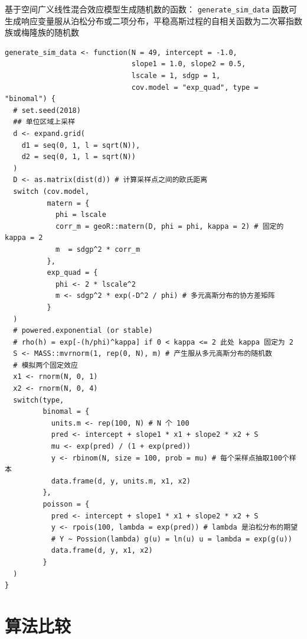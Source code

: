 \documentclass[12pt,a4paper,UTF8,twoside]{book}
\theoremstyle{definition}
\theoremstyle{definition}
\theoremstyle{definition}
\theoremstyle{remark}
\begin{document}
基于空间广义线性混合效应模型生成随机数的函数：
\texttt{generate\_sim\_data}
函数可生成响应变量服从泊松分布或二项分布，平稳高斯过程的自相关函数为二次幂指数族或梅隆族的随机数

\begin{verbatim}
generate_sim_data <- function(N = 49, intercept = -1.0, 
                              slope1 = 1.0, slope2 = 0.5,
                              lscale = 1, sdgp = 1, 
                              cov.model = "exp_quad", type = "binomal") {
  # set.seed(2018) 
  ## 单位区域上采样
  d <- expand.grid(
    d1 = seq(0, 1, l = sqrt(N)),
    d2 = seq(0, 1, l = sqrt(N))
  )
  D <- as.matrix(dist(d)) # 计算采样点之间的欧氏距离
  switch (cov.model,
          matern = {
            phi = lscale
            corr_m = geoR::matern(D, phi = phi, kappa = 2) # 固定的 kappa = 2 
            m  = sdgp^2 * corr_m 
          },
          exp_quad = {
            phi <- 2 * lscale^2
            m <- sdgp^2 * exp(-D^2 / phi) # 多元高斯分布的协方差矩阵
          }
  )
  # powered.exponential (or stable)
  # rho(h) = exp[-(h/phi)^kappa] if 0 < kappa <= 2 此处 kappa 固定为 2
  S <- MASS::mvrnorm(1, rep(0, N), m) # 产生服从多元高斯分布的随机数
  # 模拟两个固定效应
  x1 <- rnorm(N, 0, 1)
  x2 <- rnorm(N, 0, 4)
  switch(type,
         binomal = {
           units.m <- rep(100, N) # N 个 100
           pred <- intercept + slope1 * x1 + slope2 * x2 + S
           mu <- exp(pred) / (1 + exp(pred))
           y <- rbinom(N, size = 100, prob = mu) # 每个采样点抽取100个样本
           data.frame(d, y, units.m, x1, x2)
         },
         poisson = {
           pred <- intercept + slope1 * x1 + slope2 * x2 + S
           y <- rpois(100, lambda = exp(pred)) # lambda 是泊松分布的期望  
           # Y ~ Possion(lambda) g(u) = ln(u) u = lambda = exp(g(u))
           data.frame(d, y, x1, x2)
         }
  )
}
\end{verbatim}

\hypertarget{compare-algrithms}{%
\section*{算法比较}\label{compare-algrithms}}
\end{document}
